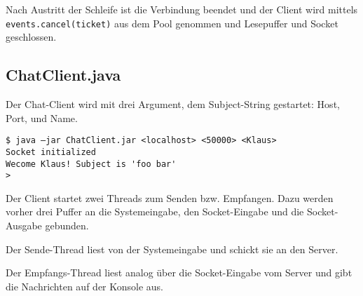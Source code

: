

Nach Austritt der Schleife ist die Verbindung beendet und der Client wird mittels {\tt events.cancel(ticket)} aus dem Pool genommen und Lesepuffer und Socket geschlossen.

\subsection*{ChatClient.java}

Der Chat-Client wird mit drei Argument, dem Subject-String gestartet: Host, Port, und Name.

\begin{verbatim}
$ java –jar ChatClient.jar <localhost> <50000> <Klaus>
Socket initialized
Wecome Klaus! Subject is 'foo bar'
> 
\end{verbatim}

Der Client startet zwei Threads zum Senden bzw. Empfangen. Dazu werden vorher drei Puffer an die Systemeingabe, den Socket-Eingabe und die Socket-Ausgabe gebunden.



Der Sende-Thread liest von der Systemeingabe und schickt sie an den Server. 



Der Empfangs-Thread liest analog über die Socket-Eingabe vom Server und gibt die Nachrichten auf der Konsole aus.


